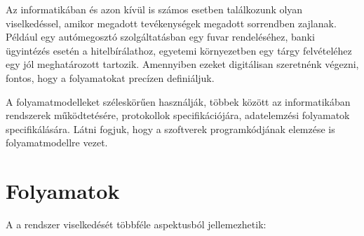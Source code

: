 
\graphicspath{ {./folyamatmodellezes/figures/} }


\newcommand{\folyamatmodellscale}{0.42}
\newcommand{\balhasab}{0.4\linewidth}
\newcommand{\jobbhasab}{0.6\linewidth}


Az informatikában és azon kívül is számos esetben találkozunk olyan viselkedéssel, amikor megadott tevékenységek megadott sorrendben zajlanak. Például egy autómegosztó szolgáltatásban egy fuvar rendeléséhez, banki ügyintézés esetén a hitelbírálathoz, egyetemi környezetben egy tárgy felvételéhez egy jól meghatározott  tartozik. Amennyiben ezeket digitálisan szeretnénk végezni, fontos, hogy a folyamatokat precízen definiáljuk.

A folyamatmodelleket széleskörűen használják, többek között az informatikában rendszerek működtetésére, protokollok specifikációjára, adatelemzési folyamatok specifikálására. Látni fogjuk, hogy a szoftverek programkódjának elemzése is folyamatmodellre vezet.

\section{Folyamatok}

A  a rendszer viselkedését többféle aspektusból jellemezhetik:

